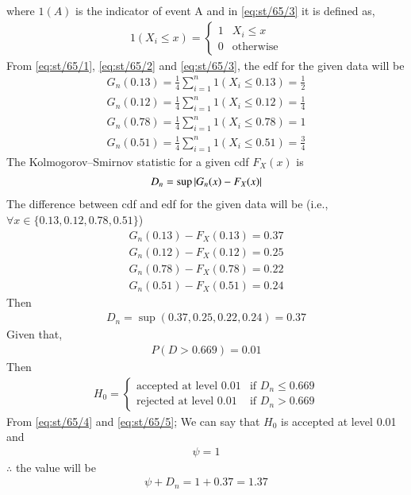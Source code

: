 \documentclass[article]{IEEEtran}
\theoremstyle{remark}
\begin{document}
where $1(A)$ is the indicator of event A and in \eqref{eq:st/65/3} it is defined as,
\begin{align}
	1(X_i \le x)=
	\begin{cases}
	1 & X_i \le x\\
	0 & \text{otherwise}
	\end{cases}
\end{align}
From \eqref{eq:st/65/1}, \eqref{eq:st/65/2} and \eqref{eq:st/65/3}, the edf for the given data will be
\begin{align}
  	G_n(0.13) = \frac{1}{4} \sum_{i=1}^{n} 1(X_i \le 0.13) = \frac{1}{2}	\\
  	G_n(0.12) = \frac{1}{4} \sum_{i=1}^{n} 1(X_i \le 0.12) = \frac{1}{4}\\
  	G_n(0.78) = \frac{1}{4} \sum_{i=1}^{n} 1(X_i \le 0.78) = 1\\
  	G_n(0.51) = \frac{1}{4} \sum_{i=1}^{n} 1(X_i \le 0.51) = \frac{3}{4}
\end{align}
The Kolmogorov–Smirnov statistic for a given cdf $F_X(x)$ is
\begin{align}
  	D_n = \sup\left\vert G_n(x) - F_X(x)\right\vert 
\end{align}
The difference between cdf and edf for the given data will be (i.e., $\forall x \in \{0.13, 0.12, 0.78, 0.51\} $)
\begin{align}
  	G_n(0.13) - F_X(0.13) = 0.37\\
  	G_n(0.12) - F_X(0.12) = 0.25\\
  	G_n(0.78) - F_X(0.78) = 0.22\\
  	G_n(0.51) - F_X(0.51) = 0.24
\end{align}
Then 
\begin{align}
  	D_n = \sup(0.37,0.25,0.22,0.24) = 0.37 \label{eq:st/65/4}
\end{align}
Given that,
\begin{align}
  	P (D > 0.669) = 0.01
\end{align}
Then
\begin{align}
H_0 =
\begin{cases}
\text{accepted at level } 0.01 & \text{if } D_n \le 0.669 \\
\text{rejected at level } 0.01 & \text{if } D_n > 0.669
\end{cases}\label{eq:st/65/5}
\end{align}
From \eqref{eq:st/65/4} and \eqref{eq:st/65/5}; We can say that $H_0$ is accepted at level 0.01 and 
\begin{align}
  	\psi = 1 
\end{align}
$\therefore$ the value will be 
\begin{align}
  	\psi + D_n = 1 + 0.37 = 1.37
\end{align}
\end{document}
